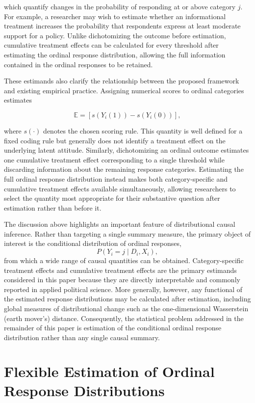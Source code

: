 \documentclass{article}
\begin{document}
which quantify changes in the probability of responding at or above category $j$. For example, a researcher may wish to estimate whether an informational treatment increases the probability that respondents express at least moderate support for a policy. Unlike dichotomizing the outcome before estimation, cumulative treatment effects can be calculated for every threshold after estimating the ordinal response distribution, allowing the full information contained in the ordinal responses to be retained.

These estimands also clarify the relationship between the proposed framework and existing empirical practice. Assigning numerical scores to ordinal categories estimates

\[
\mathbb{E} = \left[ s(Y_i(1))-s(Y_i(0)) \right],
\]

where $s(\cdot)$ denotes the chosen scoring rule. This quantity is well defined for a fixed coding rule but generally does not identify a treatment effect on the underlying latent attitude. Similarly, dichotomizing an ordinal outcome estimates one cumulative treatment effect corresponding to a single threshold while discarding information about the remaining response categories. Estimating the full ordinal response distribution instead makes both category-specific and cumulative treatment effects available simultaneously, allowing researchers to select the quantity most appropriate for their substantive question after estimation rather than before it.

The discussion above highlights an important feature of distributional causal inference. Rather than targeting a single summary measure, the primary object of interest is the conditional distribution of ordinal responses,
\[
P(Y_i=j\mid D_i,X_i),
\]
from which a wide range of causal quantities can be obtained. Category-specific treatment effects and cumulative treatment effects are the primary estimands considered in this paper because they are directly interpretable and commonly reported in applied political science. More generally, however, any functional of the estimated response distributions may be calculated after estimation, including global measures of distributional change such as the one-dimensional Wasserstein (earth mover's) distance. Consequently, the statistical problem addressed in the remainder of this paper is estimation of the conditional ordinal response distribution rather than any single causal summary.

\section{Flexible Estimation of Ordinal Response Distributions}
\label{sec:estimation}
\end{document}

